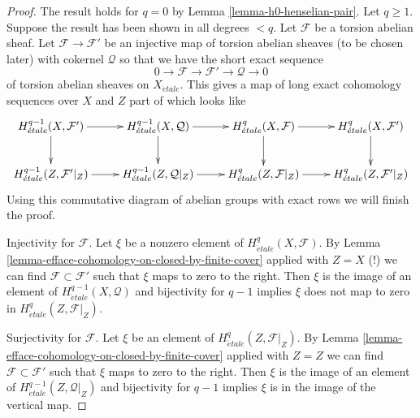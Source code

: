 \documentclass[10pt,a4paper]{amsart}
\theoremstyle{plain}
\theoremstyle{definition}
\theoremstyle{remark}
\numberwithin{equation}{subsection}
\def\etale{{\acute{e}tale}}
\begin{document}
\begin{proof}
The result holds for $q = 0$ by Lemma \ref{lemma-h0-henselian-pair}.
Let $q \geq 1$. Suppose the result has been shown in all degrees $< q$.
Let $\mathcal{F}$ be a torsion abelian sheaf. Let
$\mathcal{F} \to \mathcal{F}'$
be an injective map of torsion abelian sheaves (to be chosen later)
with cokernel $\mathcal{Q}$ so that we have the short exact sequence
$$
0 \to \mathcal{F} \to \mathcal{F}' \to \mathcal{Q} \to 0
$$
of torsion abelian sheaves on $X_\etale$. This gives a map of long exact
cohomology sequences over $X$ and $Z$ part of which looks like
$$
\xymatrix{
H^{q - 1}_\etale(X, \mathcal{F}') \ar[d] \ar[r] &
H^{q - 1}_\etale(X, \mathcal{Q}) \ar[d] \ar[r] &
H^q_\etale(X, \mathcal{F}) \ar[d] \ar[r] &
H^q_\etale(X, \mathcal{F}') \ar[d] \\
H^{q - 1}_\etale(Z, \mathcal{F}'|_Z) \ar[r] &
H^{q - 1}_\etale(Z, \mathcal{Q}|_Z) \ar[r] &
H^q_\etale(Z, \mathcal{F}|_Z) \ar[r] &
H^q_\etale(Z, \mathcal{F}'|_Z)
}
$$
Using this commutative diagram of abelian groups with exact rows
we will finish the proof.

\medskip\noindent
Injectivity for $\mathcal{F}$. Let $\xi$ be a nonzero element of
$H^q_\etale(X, \mathcal{F})$. By
Lemma \ref{lemma-efface-cohomology-on-closed-by-finite-cover} applied with
$Z = X$ (!) we can find $\mathcal{F} \subset \mathcal{F}'$ such that
$\xi$ maps to zero to the right. Then $\xi$ is the image of
an element of $H^{q - 1}_\etale(X, \mathcal{Q})$ and bijectivity
for $q - 1$ implies $\xi$ does not map to zero in
$H^q_\etale(Z, \mathcal{F}|_Z)$.

\medskip\noindent
Surjectivity for $\mathcal{F}$. Let $\xi$ be an element of
$H^q_\etale(Z, \mathcal{F}|_Z)$. By
Lemma \ref{lemma-efface-cohomology-on-closed-by-finite-cover} applied with
$Z = Z$ we can find $\mathcal{F} \subset \mathcal{F}'$ such that
$\xi$ maps to zero to the right. Then $\xi$ is the image of
an element of $H^{q - 1}_\etale(Z, \mathcal{Q}|_Z)$ and bijectivity
for $q - 1$ implies $\xi$ is in the image of the vertical map.
\end{proof}
\end{document}

